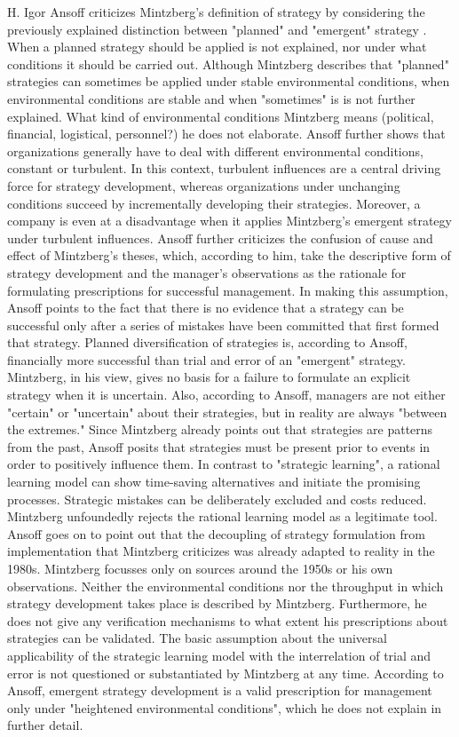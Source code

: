 \documentclass[a4paper,12pt]{article}
\begin{document}
H. Igor Ansoff criticizes Mintzberg's definition of strategy by considering
the previously explained distinction between "planned" and "emergent" strategy
\cite{ansoff}. When a planned strategy should be applied is not explained, nor
under what conditions it should be carried out. Although Mintzberg describes
that "planned" strategies can sometimes be applied under stable environmental
conditions, when environmental conditions are stable and when "sometimes" is
is not further explained. What kind of environmental conditions Mintzberg
means (political, financial, logistical, personnel?) he does not elaborate.
Ansoff further shows that organizations generally have to deal with different
environmental conditions, constant or turbulent. In this context, turbulent
influences are a central driving force for strategy development, whereas
organizations under unchanging conditions succeed by incrementally developing
their strategies. Moreover, a company is even at a disadvantage when it
applies Mintzberg's emergent strategy under turbulent influences. Ansoff
further criticizes the confusion of cause and effect of Mintzberg's theses,
which, according to him, take the descriptive form of strategy development and
the manager's observations as the rationale for formulating prescriptions for
successful management. In making this assumption, Ansoff points to the fact
that there is no evidence that a strategy can be successful only after a
series of mistakes have been committed that first formed that
strategy. Planned diversification of strategies is, according to Ansoff,
financially more successful than trial and error of an "emergent"
strategy. Mintzberg, in his view, gives no basis for a failure to formulate an
explicit strategy when it is uncertain. Also, according to Ansoff, managers
are not either "certain" or "uncertain" about their strategies, but in reality
are always "between the extremes." Since Mintzberg already points out that
strategies are patterns from the past, Ansoff posits that strategies must be
present prior to events in order to positively influence them. In contrast to
"strategic learning", a rational learning model can show time-saving
alternatives and initiate the promising processes. Strategic mistakes can be
deliberately excluded and costs reduced. Mintzberg unfoundedly rejects the
rational learning model as a legitimate tool. Ansoff goes on to point out that
the decoupling of strategy formulation from implementation that Mintzberg
criticizes was already adapted to reality in the 1980s. Mintzberg focusses
only on sources around the 1950s or his own observations. Neither the
environmental conditions nor the throughput in which strategy development
takes place is described by Mintzberg. Furthermore, he does not give any
verification mechanisms to what extent his prescriptions about strategies can
be validated. The basic assumption about the universal applicability of the
strategic learning model with the interrelation of trial and error is not
questioned or substantiated by Mintzberg at any time. According to Ansoff,
emergent strategy development is a valid prescription for management only
under "heightened environmental conditions", which he does not explain in
further detail.
\end{document}
